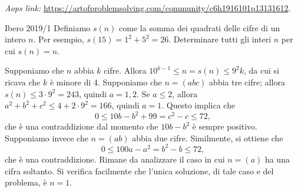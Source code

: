 \documentclass{article}
\begin{document}
\vspace{0.5cm}
\textit{Aops link:}
\href{https://artofproblemsolving.com/community/c6h1916101p13131612}
{https://artofproblemsolving.com/community/c6h1916101p13131612}.

\begin{proposition}{Ibero 2019/1}{}
	Definiamo $s(n)$ come la somma dei quadrati delle cifre di un intero $n$.
	Per esempio, $s(15)=1^2+5^2=26$. Determinare tutti gli interi $n$ per cui
	$s(n)=n$.
\end{proposition}

Supponiamo che $n$ abbia $k$ cifre. Allora $10^{k-1}\le n=s(n) \le 9^2k$,
da cui si ricava che $k$ è minore di 4.
Supponiamo che $n=(abc)$ abbia tre cifre;
allora $s(n)\le 3\cdot 9^2=243$, quindi $a=1,2$. Se $a\le 2$, allora
$a^2+b^2+c^2\le 4+2\cdot 9^2=166$, quindi $a=1$. Questo implica che
\begin{equation*}
	0\le 10b-b^2+99=c^2-c \le 72,
\end{equation*}
che è una contraddizione dal momento che $10b-b^2$ è sempre positivo.
Supponiamo invece che $n=(ab)$ abbia due cifre. Similmente, si ottiene che
\begin{equation*}
	0\le 100a-a^2=b^2-b \le 72,
\end{equation*}
che è una contraddizione. Rimane da analizzare il caso in cui $n=(a)$ ha
una cifra soltanto. Si verifica facilmente che l'unica soluzione, di tale caso
e del problema, è $n=1$.
\end{document}
